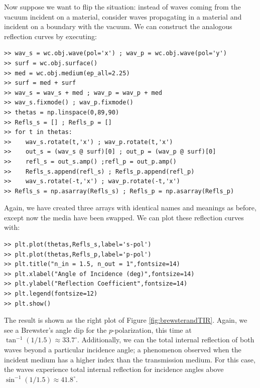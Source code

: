 \documentclass[11pt, reqno]{book}%
\newcounter{ct}
\begin{document}
Now suppose we want to flip the situation: instead of waves coming from the vacuum incident on a material, consider waves propagating in a material and incident on a boundary with the vacuum. We can construct the analogous reflection curves by executing:
\begin{verbatim}
>> wav_s = wc.obj.wave(pol='x') ; wav_p = wc.obj.wave(pol='y')
>> surf = wc.obj.surface()
>> med = wc.obj.medium(ep_all=2.25)
>> surf = med + surf
>> wav_s = wav_s + med ; wav_p = wav_p + med
>> wav_s.fixmode() ; wav_p.fixmode()
>> thetas = np.linspace(0,89,90)
>> Refls_s = [] ; Refls_p = []
>> for t in thetas:
>>    wav_s.rotate(t,'x') ; wav_p.rotate(t,'x')
>>    out_s = (wav_s @ surf)[0] ; out_p = (wav_p @ surf)[0]
>>    refl_s = out_s.amp() ;refl_p = out_p.amp()    
>>    Refls_s.append(refl_s) ; Refls_p.append(refl_p)  
>>    wav_s.rotate(-t,'x') ; wav_p.rotate(-t,'x')
>> Refls_s = np.asarray(Refls_s) ; Refls_p = np.asarray(Refls_p)
\end{verbatim}
\noindent Again, we have created three arrays with identical names and meanings as before, except now the media have been swapped. We can plot these reflection curves with:
\begin{verbatim}
>> plt.plot(thetas,Refls_s,label='s-pol')
>> plt.plot(thetas,Refls_p,label='p-pol')
>> plt.title("n_in = 1.5, n_out = 1",fontsize=14)
>> plt.xlabel("Angle of Incidence (deg)",fontsize=14)
>> plt.ylabel("Reflection Coefficient",fontsize=14)
>> plt.legend(fontsize=12)
>> plt.show()
\end{verbatim}
\noindent The result is shown as the right plot of Figure \ref{fig:brewsterandTIR}. Again, we see a Brewster's angle dip for the $p$-polarization, this time at $\tan^{-1}(1/1.5) \approx 33.7^\circ$. Additionally, we can the total internal reflection of both waves beyond a particular incidence angle; a phenomenon observed when the incident medium has a higher index than the transmission medium. For this case, the waves experience total internal reflection for incidence angles above $\sin^{-1}(1/1.5) \approx 41.8^\circ$.
\end{document}
